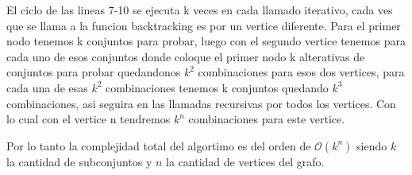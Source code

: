 El ciclo de las lineas 7-10 se ejecuta k veces en cada llamado iterativo, cada ves que se llama a la funcion backtracking es por un vertice diferente. 
Para el primer nodo tenemos k conjuntos para probar, luego con el segundo vertice tenemos para cada uno de esos conjuntos donde coloque el primer nodo k alterativas de conjuntos para probar quedandonos $k^2$ combinaciones para esos dos vertices,
para cada una de esas $k^2$ combinaciones tenemos k conjuntos quedando $k^3$ combinaciones, asi seguira en las llamadas recursivas por todos los vertices. Con lo cual con el vertice n tendremos $k^n$ combinaciones para este vertice.

Por lo tanto la complejidad total del algortimo es del orden de $\mathcal{O}(k^n)$ siendo $k$ la cantidad de subconjuntos y $n$ la cantidad de vertices del grafo.

